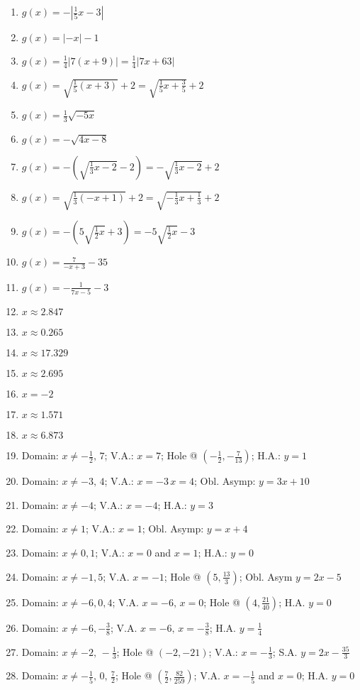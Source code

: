 \documentclass{article}
\newcounter{Review}
\begin{document}
\begin{enumerate}   \setcounter{enumi}{\value{Review}}
    \item $g(x) = -\left|\frac{1}{5}x-3\right|$
    \item $g(x) = |-x|-1$
    \item $g(x) = \frac{1}{4}|7(x+9)| = \frac{1}{4}|7x+63|$
    \item $g(x) = \sqrt{\frac{1}{5}(x+3)} + 2 = \sqrt{\frac{1}{5}x + \frac{3}{5}}+2$
    \item $g(x) = \frac{1}{3}\sqrt{-5x}$
    \item $g(x) = -\sqrt{4x-8}$
    \item $g(x) = -\left(\sqrt{\frac{1}{3}x-2}-2\right) = -\sqrt{\frac{1}{3}x-2}+2$
    \item $g(x) = \sqrt{\frac{1}{3}(-x+1)}+2 = \sqrt{-\frac{1}{3}x+\frac{1}{3}}+2$
    \item $g(x) = -\left(5\sqrt{\frac{1}{2}x}+3\right) = -5\sqrt{\frac{1}{2}x} - 3$
    \item $g(x) = \frac{7}{-x+3} - 35$
    \item $g(x) = -\frac{1}{7x-5} - 3$ 
    
    \item $x \approx 2.847$
	\item $x \approx 0.265$
	\item $x \approx 17.329$
	\item $x \approx 2.695$
	\item $x = -2$
	\item $x \approx 1.571$
	\item $x \approx 6.873$

    \item Domain: $x \neq -\frac{1}{2}, \, 7$; V.A.: $x=7$; Hole @ $\left(-\frac{1}{2},-\frac{7}{13}\right)$; H.A.: $y=1$
    \item Domain: $x \neq -3, \, 4$; V.A.: $x=-3 \, x = 4$; Obl. Asymp: $y = 3x+10$
    \item Domain: $x \neq -4$; V.A.: $x = -4$; H.A.: $y = 3$
    \item Domain: $x \neq 1$; V.A.: $x = 1$; Obl. Asymp: $y = x + 4$
    \item Domain: $x \neq 0, 1$; V.A.: $x = 0$ and $x = 1$; H.A.: $y = 0$ 
    \item Domain: $x \neq -1, 5$; V.A. $x=-1$; Hole @ $\left(5, \frac{13}{3}\right)$; Obl. Asym $y = 2x-5$
    \item Domain: $x \neq -6, 0, 4$; V.A. $x = -6, \, x = 0$; Hole @ $\left(4, \frac{21}{40}\right)$; H.A. $y = 0$
    \item Domain: $x \neq -6, -\frac{3}{8}$; V.A. $x = -6, \, x = -\frac{3}{8}$; H.A. $y = \frac{1}{4}$
    \item Domain: $x \neq -2, \, -\frac{1}{3}$; Hole @ $(-2,-21)$; V.A.: $x = -\frac{1}{3}$; S.A. $y = 2x-\frac{35}{3}$
    \item Domain: $x \neq -\frac{1}{5}, \, 0, \, \frac{7}{2}$; Hole @ $\left(\frac{7}{2}, \frac{82}{259}\right)$; V.A. $x = -\frac{1}{5}$ and $x=0$; H.A. $y=0$
    

\end{enumerate}
\end{document}
